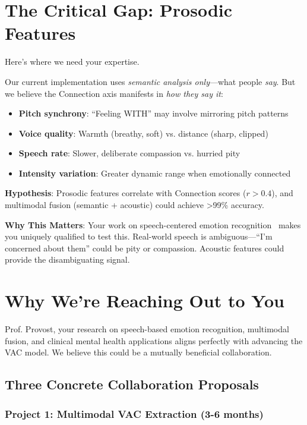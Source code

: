 \documentclass[11pt]{article}
\begin{document}
\section{The Critical Gap: Prosodic Features}

Here's where we need your expertise.

Our current implementation uses \textit{semantic analysis only}—what people \textit{say}. But we believe the Connection axis manifests in \textit{how they say it}:

\begin{itemize}
    \item \textbf{Pitch synchrony}: ``Feeling WITH'' may involve mirroring pitch patterns
    \item \textbf{Voice quality}: Warmth (breathy, soft) vs. distance (sharp, clipped)
    \item \textbf{Speech rate}: Slower, deliberate compassion vs. hurried pity
    \item \textbf{Intensity variation}: Greater dynamic range when emotionally connected
\end{itemize}

\textbf{Hypothesis}: Prosodic features correlate with Connection scores ($r > 0.4$), and multimodal fusion (semantic + acoustic) could achieve >99\% accuracy.

\textbf{Why This Matters}: Your work on speech-centered emotion recognition~\cite{provost2013,provost2015} makes you uniquely qualified to test this. Real-world speech is ambiguous—``I'm concerned about them'' could be pity or compassion. Acoustic features could provide the disambiguating signal.

\section{Why We're Reaching Out to You}

Prof. Provost, your research on speech-based emotion recognition, multimodal fusion, and clinical mental health applications aligns perfectly with advancing the VAC model. We believe this could be a mutually beneficial collaboration.

\subsection{Three Concrete Collaboration Proposals}

\subsubsection*{Project 1: Multimodal VAC Extraction (3-6 months)}
\end{document}
